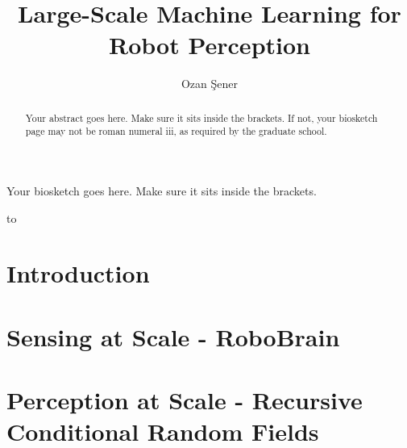 \documentclass[phd,tocprelim]{cornell}
\title{Large-Scale Machine Learning for Robot Perception}
\author {Ozan \c{S}ener}
\begin{document}
\maketitle
\makecopyright

\begin{abstract}
Your abstract goes here. Make sure it sits inside the brackets. If not,
your biosketch page may not be roman numeral iii, as required by the
graduate school.
\end{abstract}

\begin{biosketch}
Your biosketch goes here. Make sure it sits inside
the brackets.
\end{biosketch}

\begin{dedication}
to 
\end{dedication}

\begin{acknowledgements}
%
\end{acknowledgements}

\contentspage
\tablelistpage
\figurelistpage

\normalspacing \setcounter{page}{1} 
\pagestyle{cornell} \addtolength{\parskip}{0.5\baselineskip}

\chapter{Introduction}


\chapter{Sensing at Scale - RoboBrain}


\chapter{Perception at Scale - Recursive Conditional Random Fields}
\label{rcrf}

\end{document}
